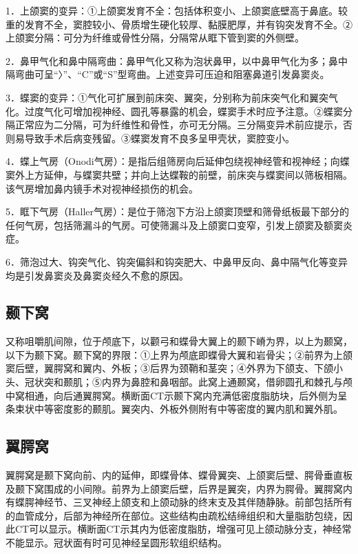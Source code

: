 1．上颌窦的变异：①上颌窦发育不全：包括体积变小、上颌窦底壁高于鼻底。较重的发育不全，窦腔较小、骨质增生硬化较厚、黏膜肥厚，并有钩突发育不全。②上颌窦分隔：可分为纤维或骨性分隔，分隔常从眶下管到窦的外侧壁。

2．鼻甲气化和鼻中隔弯曲：鼻甲气化又称为泡状鼻甲，以中鼻甲气化为多；鼻中隔弯曲可呈“〉”、“C”或“S”型弯曲。上述变异可压迫和阻塞鼻道引发鼻窦炎。

3．蝶窦的变异：①气化可扩展到前床突、翼突，分别称为前床突气化和翼突气化。过度气化可增加视神经、圆孔等暴露的机会，蝶窦手术时应予注意。②蝶窦分隔正常应为二分隔，可为纤维性和骨性，亦可无分隔。三分隔变异术前应提示，否则易导致手术后病变残留。③蝶窦发育不良多呈甲壳状，窦腔变小。

4．蝶上气房（Onodi气房）：是指后组筛房向后延伸包绕视神经管和视神经；向蝶窦外上方延伸，与蝶窦共壁；并向上达蝶鞍的前壁，前床突与蝶窦间以筛板相隔。该气房增加鼻内镜手术对视神经损伤的机会。

5．眶下气房（Haller气房）：是位于筛泡下方沿上颌窦顶壁和筛骨纸板最下部分的任何气房，包括筛漏斗的气房。可使筛漏斗及上颌窦口变窄，引发上颌窦及额窦炎症。

6．筛泡过大、钩突气化、钩突偏斜和钩突肥大、中鼻甲反向、鼻中隔气化等变异均是引发鼻窦炎及鼻窦炎经久不愈的原因。

\subsection{颞下窝}

又称咀嚼肌间隙，位于颅底下，以颧弓和蝶骨大翼上的颞下嵴为界，以上为颞窝，以下为颞下窝。颞下窝的界限：①上界为颅底即蝶骨大翼和岩骨尖；②前界为上颌窦后壁，翼腭窝和翼内、外板；③后界为颈鞘和茎突；④外界为下颌支、下颌小头、冠状突和颞肌；⑤内界为鼻腔和鼻咽部。此窝上通颞窝，借卵圆孔和棘孔与颅中窝相通，向后通翼腭窝。横断面CT示颞下窝内充满低密度脂肪块，后外侧为呈条束状中等密度影的颞肌。翼突内、外板外侧附有中等密度的翼内肌和翼外肌。

\subsection{翼腭窝}

翼腭窝是颞下窝向前、内的延伸，即蝶骨体、蝶骨翼突、上颌窦后壁、腭骨垂直板及颞下窝围成的小间隙。前界为上颌窦后壁，后界是翼突，内界为腭骨。翼腭窝内有蝶腭神经节、三叉神经上颌支和上颌动脉的终末支及其伴随静脉。前部包括所有的血管成分，后部为神经所在部位。这些结构由疏松结缔组织和大量脂肪包绕，因此CT可以显示。横断面CT示其内为低密度脂肪，增强可见上颌动脉分支，神经常不能显示。冠状面有时可见神经呈圆形软组织结构。

